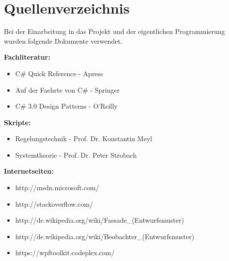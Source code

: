 \chapter{Quellenverzeichnis}

Bei der Einarbeitung in das Projekt und der eigentlichen Programmierung wurden folgende Dokumente verwendet.

\begin{description}
	 
\item \textbf{Fachliteratur:}
				
\begin{itemize}
	\item C\# Quick Reference    -    Apress
	\item Auf der Faehrte von C\#    -    Springer
	\item C\# 3.0 Design Patterns    -    O'Reilly 
\end{itemize}

\item \textbf{Skripte:}
				
\begin{itemize}
	\item Regelungstechnik    -    Prof. Dr. Konstantin Meyl
	\item Systemtheorie    -    Prof. Dr. Peter Strobach
\end{itemize}

\item \textbf{Internetseiten:}
				
\begin{itemize}
	\item http://msdn.microsoft.com/
	\item http://stackoverflow.com/
	\item http://de.wikipedia.org/wiki/Fassade\_(Entwurfsmuster)
	\item http://de.wikipedia.org/wiki/Beobachter\_(Entwurfsmuster)
	\item https://wpftoolkit.codeplex.com/
\end{itemize}

\end{description}